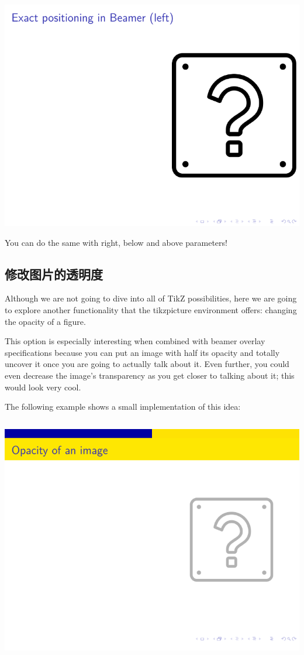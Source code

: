 \begin{column}{0.5\textwidth}
\includegraphics[page=2]{examples/beamer/beamerfigure07.pdf}

You can do the same with right, below and above parameters!

\subsection{修改图片的透明度}

Although we are not going to dive into all of TikZ possibilities, here we are going to explore another functionality that the tikzpicture environment offers: changing the opacity of a figure.

This option is especially interesting when combined with beamer overlay specifications because you can put an image with half its opacity and totally uncover it once you are going to actually talk about it. Even further, you could even decrease the image’s transparency as you get closer to talking about it; this would look very cool.

The following example shows a small implementation of this idea:

\inputminted[linenos=true]{latex}{examples/beamer/beamerfigure08.tex}

\includegraphics[page=1]{examples/beamer/beamerfigure08.pdf}


\end{column}

